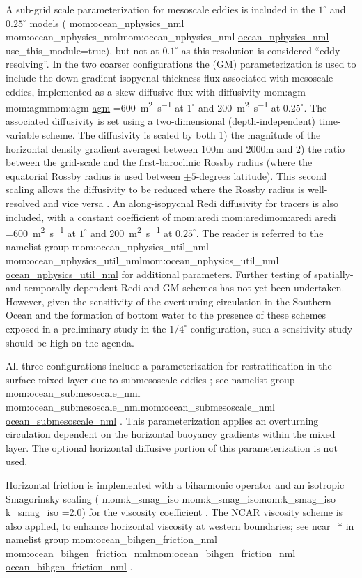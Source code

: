\documentclass[11pt]{article}
\makeatletter
\newcommand{\TODO}[1]{\note{\textcolor{blue}{\textsf{\textbf{TODO: #1}}}}}
\newcommand*{\make@hex@label}[1]{%
  \def\hex@label{#1}%
  \@onelevel@sanitize\hex@label
  \EdefEscapeHex\hex@label{\hex@label}%
}
\newcommand*{\hexhyperlink}[2]{%
  \make@hex@label{#1}%
  \hyperlink{\hex@label}{#2}%
}
\newcommand{\momlink}[2]{\hexhyperlink{mom:#2}{#1}}
\newcommand{\param}[1]{\textsf{#1}}
\newcommand{\mom}[1]{\param{\momlink{#1}{#1}}}
\makeatother
\begin{document}
A sub-grid scale parameterization for mesoscale eddies is included in the $1^\circ$ and $0.25^\circ$ models (\mom{ocean_nphysics_nml} \param{use_this_module}=true), but not at $0.1^\circ$ as this resolution is considered ``eddy-resolving''. 
In the two coarser configurations the \citet{Gent1990} (GM) parameterization is used to include the down-gradient isopycnal thickness flux associated with mesoscale eddies, implemented as a skew-diffusive flux \citep{Griffies1998} with diffusivity \mom{agm}=\SI{600}{m^2s^{-1}} at $1^\circ$ and \SI{200}{m^2s^{-1}} at $0.25^\circ$.
The associated diffusivity is set using a two-dimensional (depth-independent) time-variable scheme. 
The diffusivity is scaled by both 1) the magnitude of the horizontal density gradient averaged between $100$m and $2000$m and 2) the ratio between the grid-scale and the first-baroclinic Rossby radius (where the equatorial Rossby radius is used between $\pm5$-degrees latitude). \TODO{check that this applies at 0.25deg}
This second scaling allows the diffusivity to be reduced where the Rossby radius is well-resolved and vice versa \citep{Hallberg2013a}. 
An along-isopycnal Redi diffusivity \citep{Redi1982} for tracers is also included, with a constant coefficient of \mom{aredi}=\SI{600}{m^2s^{-1}} at $1^\circ$ and \SI{200}{m^2s^{-1}} at $0.25^\circ$. 
The reader is referred to the namelist group \mom{ocean_nphysics_util_nml} for additional parameters. 
Further testing of spatially- and temporally-dependent Redi and GM schemes has not yet been undertaken. 
However, given the sensitivity of the overturning circulation in the Southern Ocean and the formation of bottom water to the presence of these schemes exposed in a preliminary study in the $1/4^\circ$ configuration, such a sensitivity study should be high on the agenda.

All three configurations include a parameterization for restratification in the surface mixed layer due to submesoscale eddies \citep{Fox-Kemper2008}; see namelist group \mom{ocean_submesoscale_nml}. 
This parameterization applies an overturning circulation dependent on the horizontal buoyancy gradients within the mixed layer. 
The optional horizontal diffusive portion of this parameterization is not used.

Horizontal friction is implemented with a biharmonic operator and an isotropic Smagorinsky scaling (\mom{k_smag_iso}=2.0) for the viscosity coefficient \citep{Griffies2000a}.
The NCAR viscosity scheme is also applied, to enhance horizontal viscosity at western boundaries; see \param{ncar_*} in namelist group \mom{ocean_bihgen_friction_nml}.
\end{document}
